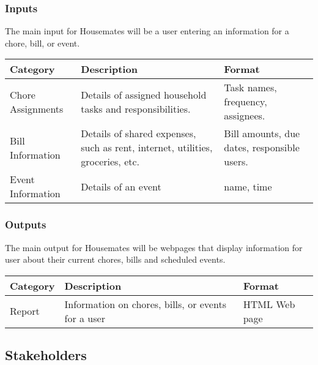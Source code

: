 \documentclass{article}
\begin{document}
\subsubsection{Inputs}
The main input for Housemates will be a user entering an information for a chore, bill, or event.
\begin{center}
\begin{tabular}{|p{4cm}|p{4.5cm}|p{3.5cm}|}
\hline
\textbf{Category} & \textbf{Description} & \textbf{Format} \\
\hline
Chore Assignments & Details of assigned household tasks and responsibilities. & Task names, frequency, assignees. \\
\hline
Bill Information & Details of shared expenses, such as rent, internet, utilities, groceries, etc. & Bill amounts, due dates, responsible users. \\
\hline
Event Information & Details of an event & name, time\\
\hline
\end{tabular}
\end{center}

\subsubsection{Outputs}
The main output for Housemates will be webpages that display information for user about their current chores, bills and scheduled events.
\begin{center}
\begin{tabular}{|p{4cm}|p{4.5cm}|p{3.5cm}|}
\hline
\textbf{Category} & \textbf{Description} & \textbf{Format} \\
\hline
Report & Information on  chores, bills, or events for a user & HTML Web page \\
\hline
\end{tabular}
\end{center}

\subsection{Stakeholders}
\end{document}
